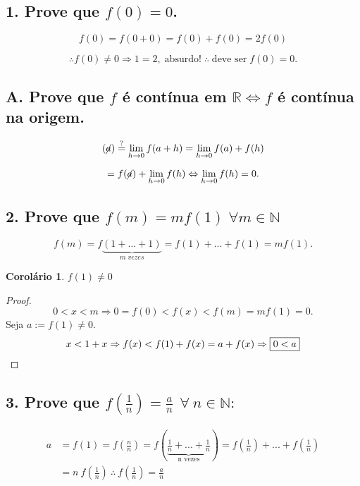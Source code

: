 \documentclass{article}
\newtheorem*{corollary}{Corolário}
\begin{document}
\subsection*{1. Prove que $f(0) = 0$.}

\[f(0) = f(0+0) = f(0)+f(0) = 2f(0)\]

\[\therefore f(0) \neq 0 \Rightarrow 1 = 2,\; \text{absurdo!}\; \therefore\; \text{deve ser}\; f(0) = 0.\]

\subsection*{A. Prove que $f$ é contínua em $\mathbb{R} \Leftrightarrow f$ é contínua na origem.}

\[(\cancel{a}) \stackrel{?}{=} \lim_{h \rightarrow 0} f(a+h) = \lim_{h \rightarrow 0} f(a)+f(h)\]

\[= f(\cancel{a}) + \lim_{h \rightarrow 0} f(h) \Leftrightarrow \lim_{h \rightarrow 0} f(h) = 0.\]

\subsection*{2. Prove que $f(m) = mf(1)\; \forall m \in \mathbb{N}$}

\[f(m) = f \underbrace{(1+...+1)}_{m\; vezes} = f(1)+...+f(1) = mf(1).\]

\begin{corollary}
$f(1) \neq 0$
\end{corollary}


\begin{proof}\renewcommand{\qedsymbol}{}
\[0<x<m \Rightarrow 0 = f(0) < f(x) < f(m) = mf(1) = 0.\]
Seja $a := f(1) \neq 0.$
\[x<1+x \Rightarrow f(x) < f(1)+f(x) = a+f(x) \Rightarrow \fbox{$0<a$}\]
\end{proof}

\pagebreak
\subsection*{3. Prove que $f( \frac{1}{n} )  = \frac{a}{n} \ \ \forall \ n \in \mathbb{N}:$ }
\begin{align*}
a &= f(1) = f(\frac{n}{n}) = f(\underbrace{\frac{1}{n} + ... + \frac{1}{n}}_\text{n vezes}) = f(\frac{1}{n}) + ... + f(\frac{1}{n}) \\
 &= n \ f(\frac{1}{n}) \ \therefore \ f(\frac{1}{n}) = \frac{a}{n}
\end{align*}
\end{document}

